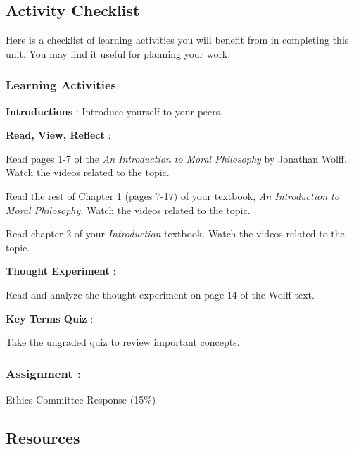 \documentclass[
]{book}
\begin{document}
\hypertarget{activity-checklist}{%
\subsection*{Activity Checklist}\label{activity-checklist}}

Here is a checklist of learning activities you will benefit from in completing this unit. You may find it useful for planning your work.

\begin{reflect}
\hypertarget{learning-activities}{%
\subsubsection*{Learning Activities}\label{learning-activities}}

\textbf{Introductions} : Introduce yourself to your peers.

\textbf{Read, View, Reflect} :

Read pages 1-7 of the \emph{An Introduction to Moral Philosophy} by Jonathan Wolff. Watch the videos related to the topic.

Read the rest of Chapter 1 (pages 7-17) of your textbook, \emph{An Introduction to Moral Philosophy}. Watch the videos related to the topic.

Read chapter 2 of your \emph{Introduction} textbook. Watch the videos related to the topic.

\textbf{Thought Experiment} :

Read and analyze the thought experiment on page 14 of the Wolff text.

\textbf{Key Terms Quiz} :

Take the ungraded quiz to review important concepts.

\hypertarget{assignment}{%
\subsubsection{\texorpdfstring{\textbf{Assignment} :}{Assignment :}}\label{assignment}}

Ethics Committee Response (15\%)
\end{reflect}

\hypertarget{resources}{%
\subsection*{Resources}\label{resources}}
\end{document}
